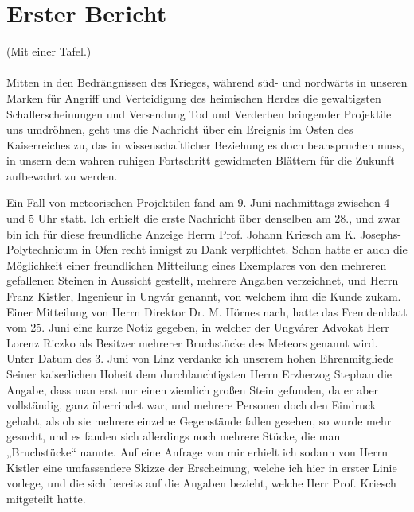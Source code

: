 \documentclass[a4paper, 11pt, oneside, german]{article}
\begin{document}
\section{Erster Bericht}
\begin{center}
(Mit einer Tafel.)
\end{center}
\paragraph{}
Mitten in den Bedrängnissen des Krieges, während süd- und nordwärts in unseren Marken für Angriff und Verteidigung des heimischen Herdes die gewaltigsten Schallerscheinungen und Versendung Tod und Verderben bringender Projektile uns umdröhnen, geht uns die Nachricht über ein Ereignis im Osten des Kaiserreiches zu, das in wissenschaftlicher Beziehung es doch beanspruchen muss, in unsern dem wahren ruhigen Fortschritt gewidmeten Blättern für die Zukunft aufbewahrt zu werden.

Ein Fall von meteorischen Projektilen fand am 9. Juni nachmittags zwischen 4 und 5 Uhr statt. Ich erhielt die erste Nachricht über denselben am 28., und zwar bin ich für diese freundliche Anzeige Herrn Prof. Johann Kriesch am K. Josephs-Polytechnicum in Ofen recht innigst zu Dank verpflichtet. Schon hatte er auch die Möglichkeit einer freundlichen Mitteilung eines Exemplares von den mehreren gefallenen Steinen in Aussicht gestellt, mehrere Angaben verzeichnet, und Herrn Franz Kistler, Ingenieur in Ungvár genannt, von welchem ihm die Kunde zukam. Einer Mitteilung von Herrn Direktor Dr. M. Hörnes nach, hatte das Fremdenblatt vom 25. Juni eine kurze Notiz gegeben, in welcher der Ungvárer Advokat Herr Lorenz Riczko als Besitzer mehrerer Bruchstücke des Meteors genannt wird. Unter Datum des 3. Juni von Linz verdanke ich unserem hohen Ehrenmitgliede Seiner kaiserlichen Hoheit dem durchlauchtigsten Herrn Erzherzog Stephan die Angabe, dass man erst nur einen ziemlich großen Stein gefunden, da er aber vollständig, ganz überrindet war, und mehrere Personen doch den Eindruck gehabt, als ob sie mehrere einzelne Gegenstände fallen gesehen, so wurde mehr gesucht, und es fanden sich allerdings noch mehrere Stücke, die man „Bruchstücke“ nannte. Auf eine Anfrage von mir erhielt ich sodann von Herrn Kistler eine umfassendere Skizze der Erscheinung, welche ich hier in erster Linie vorlege, und die sich bereits auf die Angaben bezieht, welche Herr Prof. Kriesch mitgeteilt hatte.
\end{document}
